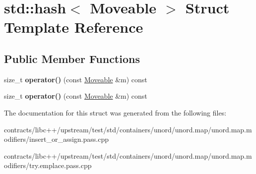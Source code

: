 \hypertarget{structstd_1_1hash_3_01_moveable_01_4}{}\section{std\+:\+:hash$<$ Moveable $>$ Struct Template Reference}
\label{structstd_1_1hash_3_01_moveable_01_4}
\subsection*{Public Member Functions}
\begin{DoxyCompactItemize}
\item 
\mbox{\label{structstd_1_1hash_3_01_moveable_01_4_ac72ad614e8a6ce5afca481d7647b9cd9}} 
size\+\_\+t {\bfseries operator()} (const \mbox{\hyperlink{class_moveable}{Moveable}} \&m) const
\item 
\mbox{\label{structstd_1_1hash_3_01_moveable_01_4_ac72ad614e8a6ce5afca481d7647b9cd9}} 
size\+\_\+t {\bfseries operator()} (const \mbox{\hyperlink{class_moveable}{Moveable}} \&m) const
\end{DoxyCompactItemize}


The documentation for this struct was generated from the following files\+:\begin{DoxyCompactItemize}
\item 
contracts/libc++/upstream/test/std/containers/unord/unord.\+map/unord.\+map.\+modifiers/insert\+\_\+or\+\_\+assign.\+pass.\+cpp\item 
contracts/libc++/upstream/test/std/containers/unord/unord.\+map/unord.\+map.\+modifiers/try.\+emplace.\+pass.\+cpp\end{DoxyCompactItemize}

